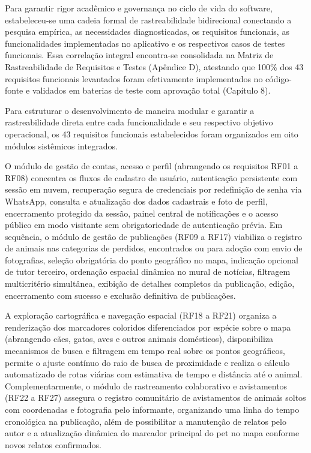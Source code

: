Para garantir rigor acadêmico e governança no ciclo de vida do software, estabeleceu-se uma cadeia formal de rastreabilidade bidirecional conectando a pesquisa empírica, as necessidades diagnosticadas, os requisitos funcionais, as funcionalidades implementadas no aplicativo e os respectivos casos de testes funcionais. Essa correlação integral encontra-se consolidada na Matriz de Rastreabilidade de Requisitos e Testes (Apêndice D), atestando que 100\% dos 43 requisitos funcionais levantados foram efetivamente implementados no código-fonte e validados em baterias de teste com aprovação total (Capítulo 8).

Para estruturar o desenvolvimento de maneira modular e garantir a rastreabilidade direta entre cada funcionalidade e seu respectivo objetivo operacional, os 43 requisitos funcionais estabelecidos foram organizados em oito módulos sistêmicos integrados.

O módulo de gestão de contas, acesso e perfil (abrangendo os requisitos RF01 a RF08) concentra os fluxos de cadastro de usuário, autenticação persistente com sessão em nuvem, recuperação segura de credenciais por redefinição de senha via WhatsApp, consulta e atualização dos dados cadastrais e foto de perfil, encerramento protegido da sessão, painel central de notificações e o acesso público em modo visitante sem obrigatoriedade de autenticação prévia. Em sequência, o módulo de gestão de publicações (RF09 a RF17) viabiliza o registro de animais nas categorias de perdidos, encontrados ou para adoção com envio de fotografias, seleção obrigatória do ponto geográfico no mapa, indicação opcional de tutor terceiro, ordenação espacial dinâmica no mural de notícias, filtragem multicritério simultânea, exibição de detalhes completos da publicação, edição, encerramento com sucesso e exclusão definitiva de publicações.

A exploração cartográfica e navegação espacial (RF18 a RF21) organiza a renderização dos marcadores coloridos diferenciados por espécie sobre o mapa (abrangendo cães, gatos, aves e outros animais domésticos), disponibiliza mecanismos de busca e filtragem em tempo real sobre os pontos geográficos, permite o ajuste contínuo do raio de busca de proximidade e realiza o cálculo automatizado de rotas viárias com estimativa de tempo e distância até o animal. Complementarmente, o módulo de rastreamento colaborativo e avistamentos (RF22 a RF27) assegura o registro comunitário de avistamentos de animais soltos com coordenadas e fotografia pelo informante, organizando uma linha do tempo cronológica na publicação, além de possibilitar a manutenção de relatos pelo autor e a atualização dinâmica do marcador principal do pet no mapa conforme novos relatos confirmados.


